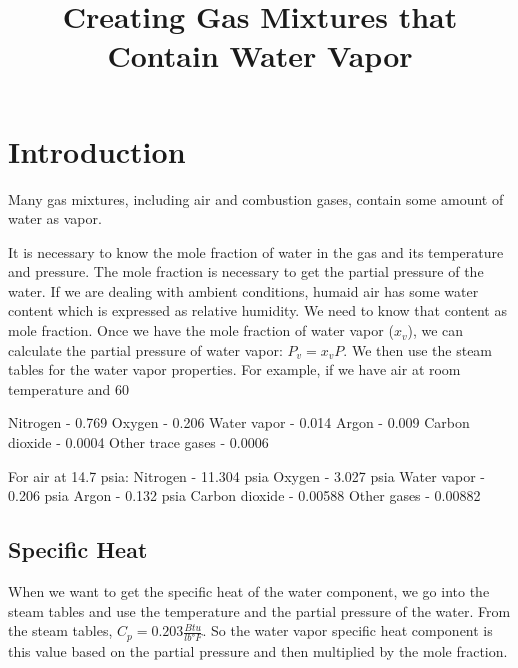 \documentclass[]{article}
\title{Creating Gas Mixtures that Contain Water Vapor}
\author{}
\begin{document}
\maketitle

\begin{abstract}

\end{abstract}

\section{Introduction}
Many gas mixtures, including air and combustion gases, contain some amount of water as vapor.

It is necessary to know the mole fraction of water in the gas and its temperature and pressure. The mole fraction is necessary to get the partial pressure of the water. If we are dealing with ambient conditions, humaid air has some water content which is expressed as relative humidity. We need to know that content as  mole fraction. Once we have the mole fraction of water vapor ($x_v$), we can calculate the partial pressure of water vapor: $P_v=x_v P$. We then use the steam tables for the water vapor properties.  For example, if we have air at room temperature and 60%

Nitrogen - 0.769
Oxygen - 0.206
Water vapor - 0.014
Argon - 0.009
Carbon dioxide - 0.0004
Other trace gases - 0.0006

For air at 14.7 psia:
Nitrogen - 11.304 psia
Oxygen - 3.027 psia
Water vapor - 0.206 psia
Argon - 0.132 psia
Carbon dioxide - 0.00588
Other gases - 0.00882


\subsection{Specific Heat}
When we want to get the specific heat of the water component, we go into the steam tables and use the temperature and the partial pressure of the water. From the steam tables, $C_p = 0.203 \frac{Btu}{lb°F}$. So the water vapor specific heat component is this value based on the partial pressure and then multiplied by the mole fraction.
\end{document}
